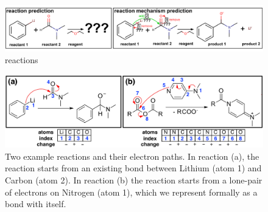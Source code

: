 \documentclass{article}
\begin{document}
\begin{figure}
\centering
\includegraphics[width=\textwidth]{reaction_diagram}
\caption{reactions}
\end{figure}

\begin{figure}
\centering
\includegraphics[width=\textwidth]{rxn_example}
\vspace{-3ex}
\caption{Two example reactions and their electron paths. In reaction (a), the reaction starts from an existing bond between Lithium (atom 1) and Carbon (atom 2). In reaction (b) the reaction starts from a lone-pair of electrons on Nitrogen (atom 1), which we represent formally as a bond with itself.}
\label{fig:example}
\end{figure}






 






\end{document}
